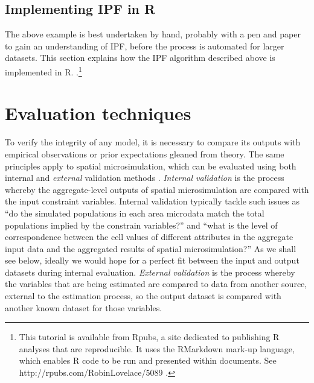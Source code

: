 \documentclass[a4paper,10pt]{article}
\begin{document}
\subsection{Implementing IPF in R} \label{simplementing}
The above example is best undertaken by hand, probably with a pen and paper
to gain an understanding of IPF, before the process is automated for 
larger datasets. This section explains how the IPF
algorithm described above is implemented in R.
\citep{Lovelace2013-trs}.\footnote{This 
tutorial is available from Rpubs, a site dedicated
to publishing R analyses that are reproducible. It uses the RMarkdown
mark-up language, which enables R code to be run and presented within
documents. See http://rpubs.com/RobinLovelace/5089 \label{fnrpub} .
}

\section{Evaluation techniques}

To verify the integrity of any model, it is necessary to compare its outputs
with empirical observations or prior expectations gleaned from theory.
The same principles apply to spatial microsimulation, which can be evaluated using
both internal and \emph{external} validation methods \citep{Edwards2009}.
\emph{Internal validation} is the process whereby
the aggregate-level outputs of spatial microsimulation are compared with
the input constraint variables. Internal validation typically tackle such issues
as ``do the simulated populations in each area
microdata match the total populations implied by the constrain variables?''
and ``what is the level of correspondence between the cell values of different
attributes in the aggregate input data and the aggregated results of spatial microsimulation?''
As we shall see below, ideally we would hope for a perfect fit between the input
and output datasets during internal evaluation.
\emph{External validation} is the process whereby the variables that are
being estimated are compared to data from another source,
external to the estimation process, so the output dataset is compared with
another known dataset for those variables.
\end{document}
